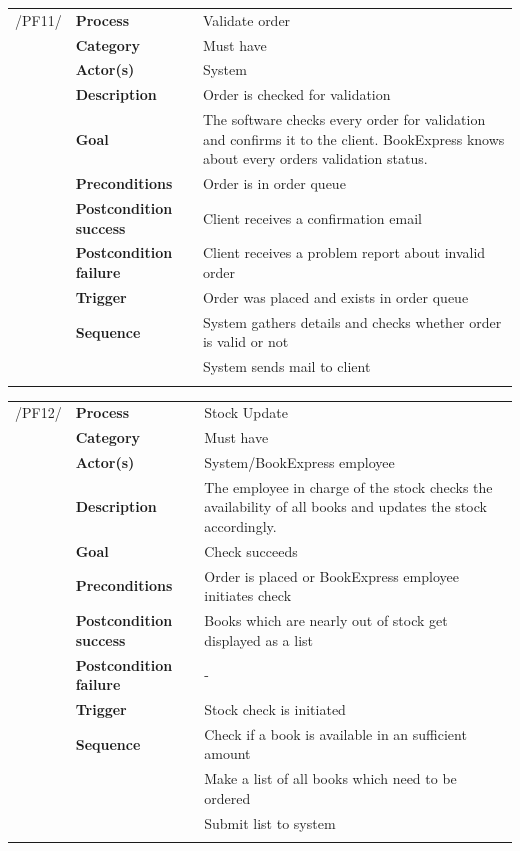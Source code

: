 \documentclass[11pt,a4paper,oneside,svgnames]{report}
\begin{document}
\noindent
\begin{tabular}{p{1.5cm}p{3cm}p{8cm}}
\cellcolor{white}	 /PF11/	& \textbf{Process} & Validate order\\ 
\cellcolor{white}		& \textbf{Category} & Must have\\
\cellcolor{white}		& \textbf{Actor(s)} & System\\ 
\cellcolor{white}		& \textbf{Description}	 & Order is checked for validation\\ 
\cellcolor{white}		& \textbf{Goal} & The software checks every order for validation and confirms it to the client. BookExpress knows about every orders validation status.\\
\cellcolor{white}		& \textbf{Preconditions} & Order is in order queue\\
\cellcolor{white}		& \textbf{Postcondition success} & Client receives a confirmation email\\
\cellcolor{white}		& \textbf{Postcondition failure} & Client receives a problem report about invalid order\\
\cellcolor{white}		& \textbf{Trigger} & Order was placed and exists in order queue\\
\cellcolor{white}		& \textbf{Sequence} & System  gathers details and checks whether order is valid or not\\
\cellcolor{white}		& & System sends mail to client\\
\cellcolor{white}\hfill \\
\end{tabular}

\noindent
\begin{tabular}{p{1.5cm}p{3cm}p{8cm}}
\cellcolor{white}	 /PF12/	& \textbf{Process} & Stock Update\\ 
\cellcolor{white}		& \textbf{Category} & Must have\\
\cellcolor{white}		& \textbf{Actor(s)} & System/BookExpress employee\\ 
\cellcolor{white}		& \textbf{Description}	 & The employee in charge of the stock checks the availability of all books and updates the stock accordingly.\\ 
\cellcolor{white}		& \textbf{Goal} & Check succeeds\\
\cellcolor{white}		& \textbf{Preconditions} & Order is placed or BookExpress employee initiates check\\
\cellcolor{white}		& \textbf{Postcondition success} & Books which are nearly out of stock get displayed as a list\\
\cellcolor{white}		& \textbf{Postcondition failure} & -\\
\cellcolor{white}		& \textbf{Trigger} & Stock check is initiated\\
\cellcolor{white}		& \textbf{Sequence} & Check if a book is available in an sufficient amount\\
\cellcolor{white}		& & Make a list of all books which need to be ordered\\
\cellcolor{white}		& & Submit list to system\\
\cellcolor{white}\hfill \\
\end{tabular}
\end{document}
